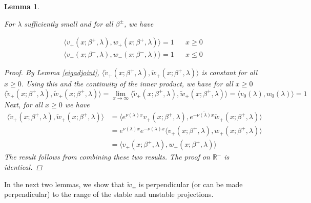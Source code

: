 \documentclass[12pt]{article}
\def\R{{\mathbb R}}
\newtheorem{lemma}{Lemma}
\begin{document}
\begin{lemma}\label{vwIP1}

For $\lambda$ sufficiently small and for all $\beta^\pm$, we have

\begin{align}
\langle v_+(x; \beta^+, \lambda), w_+(x; \beta^+, \lambda) \rangle = 1 && x \geq 0\\
\langle v_-(x; \beta^-, \lambda), w_-(x; \beta^-, \lambda) \rangle = 1 && x \leq 0
\end{align}

\begin{proof}
By Lemma \ref{eigadjoint}, $\langle \tilde{v}_+(x; \beta^+, \lambda), \tilde{w}_+(x; \beta^+, \lambda) \rangle$ is constant for all $x \geq 0$. Using this and the continuity of the inner product, we have for all $x \geq 0$
\begin{equation*}
\langle \tilde{v}_+(x; \beta^+, \lambda), \tilde{w}_+(x; \beta^+, \lambda) \rangle = \lim_{x \rightarrow \infty} \langle \tilde{v}_+(x; \beta^+, \lambda), \tilde{w}_+(x; \beta^+, \lambda) \rangle = \langle v_0(\lambda), w_0(\lambda) \rangle = 1
\end{equation*}
Next, for all $x \geq 0$ we have
\begin{align*}
\langle \tilde{v}_+(x; \beta^+, \lambda), \tilde{w}_+(x; \beta^+, \lambda) \rangle
&= \langle e^{\nu(\lambda) x } v_+(x; \beta^+, \lambda), e^{-\overline{\nu(\lambda)} x} \tilde{w}_+(x; \beta^+, \lambda) \rangle \\
&= e^{\nu(\lambda) x } e^{-\nu(\lambda) x } \langle v_+(x; \beta^+, \lambda), w_+(x; \beta^+, \lambda) \rangle \\
&= \langle v_+(x; \beta^+, \lambda), w_+(x; \beta^+, \lambda) \rangle
\end{align*}
The result follows from combining these two results. The proof on $\R^-$ is identical.
\end{proof}
\end{lemma}

In the next two lemmas, we show that $\tilde{w}_\pm$ is perpendicular (or can be made perpendicular) to the range of the stable and unstable projections.

\end{document}
